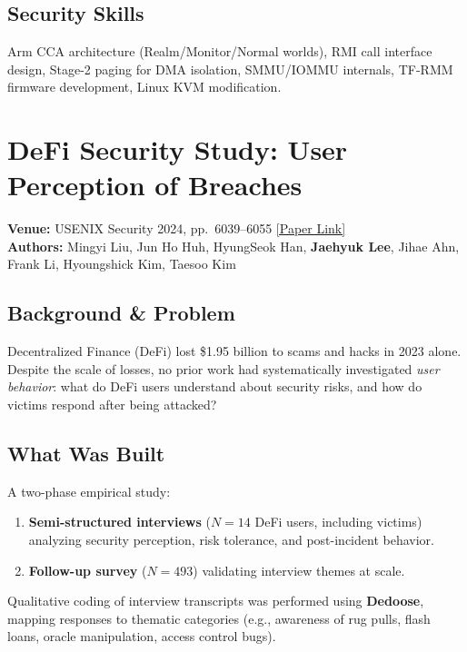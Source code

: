 \documentclass[11pt,letterpaper]{article}
\begin{document}
\subsection*{Security Skills}
Arm CCA architecture (Realm/Monitor/Normal worlds), RMI call interface design, Stage-2 paging for DMA isolation, SMMU/IOMMU internals, TF-RMM firmware development, Linux KVM modification.

\newpage

\section{DeFi Security Study: User Perception of Breaches}
\textbf{Venue:} USENIX Security 2024, pp.\ 6039--6055 \hfill
\href{https://www.usenix.org/conference/usenixsecurity24/presentation/liu-mingyi}{[Paper Link]}\\
\textbf{Authors:} Mingyi Liu, Jun Ho Huh, HyungSeok Han, \textbf{Jaehyuk Lee}, Jihae Ahn, Frank Li, Hyoungshick Kim, Taesoo Kim

\subsection*{Background \& Problem}
Decentralized Finance (DeFi) lost \$1.95 billion to scams and hacks in 2023 alone.
Despite the scale of losses, no prior work had systematically investigated \emph{user behavior}: what do DeFi users understand about security risks, and how do victims respond after being attacked?

\subsection*{What Was Built}
A two-phase empirical study:
\begin{enumerate}
    \item \textbf{Semi-structured interviews} ($N=14$ DeFi users, including victims) analyzing security perception, risk tolerance, and post-incident behavior.
    \item \textbf{Follow-up survey} ($N=493$) validating interview themes at scale.
\end{enumerate}
Qualitative coding of interview transcripts was performed using \textbf{Dedoose}, mapping responses to thematic categories (e.g., awareness of rug pulls, flash loans, oracle manipulation, access control bugs).
\end{document}
